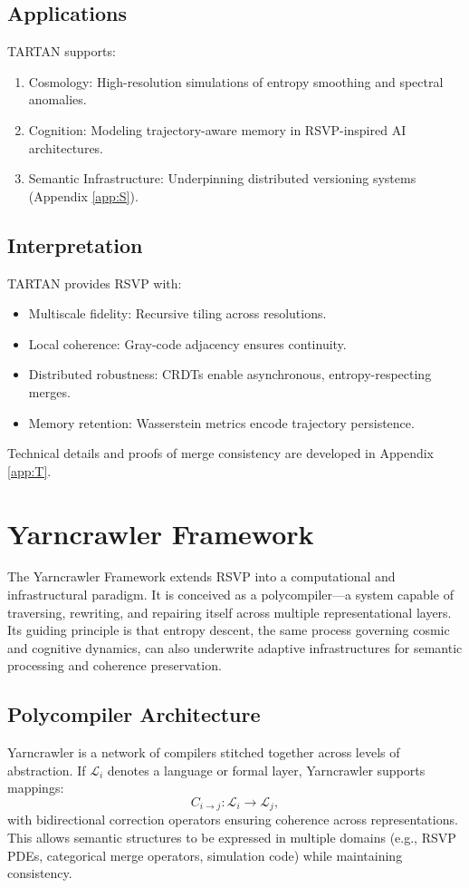 \documentclass[12pt]{report}
\begin{document}
\section{Applications}
TARTAN supports:
\begin{enumerate}
    \item Cosmology: High-resolution simulations of entropy smoothing and spectral anomalies.
    \item Cognition: Modeling trajectory-aware memory in RSVP-inspired AI architectures.
    \item Semantic Infrastructure: Underpinning distributed versioning systems (Appendix \ref{app:S}).
\end{enumerate}

\section{Interpretation}
TARTAN provides RSVP with:
\begin{itemize}
    \item Multiscale fidelity: Recursive tiling across resolutions.
    \item Local coherence: Gray-code adjacency ensures continuity.
    \item Distributed robustness: CRDTs enable asynchronous, entropy-respecting merges.
    \item Memory retention: Wasserstein metrics encode trajectory persistence.
\end{itemize}
Technical details and proofs of merge consistency are developed in Appendix \ref{app:T}.

\chapter{Yarncrawler Framework}
\label{app:U}
The Yarncrawler Framework extends RSVP into a computational and infrastructural paradigm. It is conceived as a polycompiler—a system capable of traversing, rewriting, and repairing itself across multiple representational layers. Its guiding principle is that entropy descent, the same process governing cosmic and cognitive dynamics, can also underwrite adaptive infrastructures for semantic processing and coherence preservation.

\section{Polycompiler Architecture}
Yarncrawler is a network of compilers stitched together across levels of abstraction. If \(\mathcal{L}_i\) denotes a language or formal layer, Yarncrawler supports mappings:
\[
C_{i \to j} : \mathcal{L}_i \longrightarrow \mathcal{L}_j,
\]
with bidirectional correction operators ensuring coherence across representations. This allows semantic structures to be expressed in multiple domains (e.g., RSVP PDEs, categorical merge operators, simulation code) while maintaining consistency.
\end{document}
